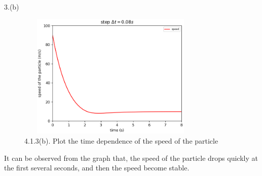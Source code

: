 \documentclass{book}
\begin{document}
\vspace{0.004\textheight}
{\Large 3.(b)}
\begin{figure}[H]
  \centering
  \includegraphics[width=9cm,height=6cm]{project4.1.3(b).png}
  \caption{4.1.3(b). Plot the time dependence of the speed of the particle}
\end{figure}
It can be observed from the graph that, the speed of the particle drops quickly at the first several seconds, and then the speed become stable.
\end{document}
